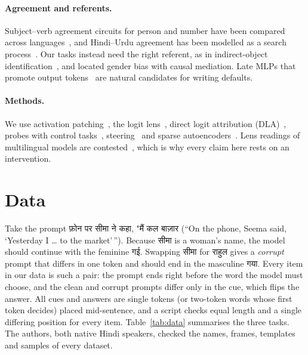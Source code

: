 \documentclass[11pt]{article}
\newcommand{\hi}[1]{{\devfont #1}}
\begin{document}
\paragraph{Agreement and referents.} Subject--verb agreement circuits for person and number have been compared across languages~\cite{ferrando2024,gidi2026}, and Hindi--Urdu agreement has been modelled as a search process~\cite{zhou2024}. Our tasks instead need the right referent, as in indirect-object identification~\cite{wang2022}, and \citet{vig2020} located gender bias with causal mediation. Late MLPs that promote output tokens~\cite{geva2022} are natural candidates for writing defaults.

\paragraph{Methods.} We use activation patching~\cite{meng2022,zhang2024,heimersheim2024}, the logit lens~\cite{nostalgebraist2020}, direct logit attribution (DLA)~\cite{elhage2021}, probes with control tasks~\cite{hewitt2019,belinkov2022}, steering~\cite{turner2023} and sparse autoencoders~\cite{cunningham2024,rajamanoharan2024,gemmascope2}. Lens readings of multilingual models are contested~\cite{wendler2024,bayazit2026,panchal2026}, which is why every claim here rests on an intervention.

\section{Data}
\label{sec:data}

Take the prompt \hi{फ़ोन पर सीमा ने कहा, "मैं कल बाज़ार} (``On the phone, Seema said, `Yesterday I \ldots{} to the market'\,''). Because \hi{सीमा} is a woman's name, the model should continue with the feminine \hi{गई}. Swapping \hi{सीमा} for \hi{राहुल} gives a \emph{corrupt} prompt that differs in one token and should end in the masculine \hi{गया}. Every item in our data is such a pair: the prompt ends right before the word the model must choose, and the clean and corrupt prompts differ only in the cue, which flips the answer. All cues and answers are single tokens (or two-token words whose first token decides) placed mid-sentence, and a script checks equal length and a single differing position for every item. Table~\ref{tab:data} summarises the three tasks. The authors, both native Hindi speakers, checked the names, frames, templates and samples of every dataset.
\end{document}

